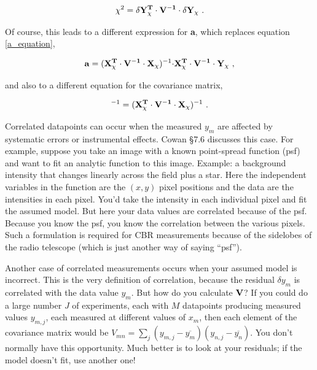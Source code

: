 \documentclass[psfig,preprint]{aastex}
\begin{document}
\begin{mathletters}
\begin{equation}
\label{chisq_cov}
\chi^2 =  {\bf \delta Y_\chi^T \cdot V^{-1} \cdot \delta Y_\chi} \ .
\end{equation}

\noindent Of course, this leads to a different expression for {\bf a},
which replaces equation \ref{a_equation},

\begin{equation}
{\bf a} = ({\bf X_\chi^T \cdot V^{-1} \cdot X_\chi})^{-1} 
	{\bf \cdot X_\chi^T \cdot V^{-1} \cdot Y_\chi}  \ ,
\end{equation}

\noindent and also to a different equation for the covariance matrix,

\begin{equation}
[\alpha_\chi]^{-1} = ({\bf X_\chi^T \cdot V^{-1} \cdot X_\chi})^{-1} \ .
\end{equation}
\end{mathletters}

	Correlated datapoints can occur when the measured $y_m$ are
affected by systematic errors or instrumental effects.  Cowan \S 7.6
discusses this case.  For example, suppose you take an image with a
known point-spread function (psf) and want to fit an analytic function
to this image.  Example: a background intensity that changes linearly
across the field plus a star.  Here the independent variables in the
function are the $(x,y)$ pixel positions and the data are the
intensities in each pixel.  You'd take the intensity in each individual
pixel and fit the assumed model.  But here your data values are
correlated because of the psf.  Because you know the psf, you know the
correlation between the various pixels.  Such a formulation is required
for CBR measurements because of the sidelobes of the radio telescope
(which is just another way of saying ``psf'').

	Another case of correlated measurements occurs when your assumed
model is incorrect.  This is the very definition of correlation, because
the residual $\delta y_m$ is correlated with the data value $y_m$.  But
how do you calculate ${\bf V}$? If you could do a large number $J$ of
experiments, each with $M$ datapoints producing measured values
$y_{m,j}$, each measured at different values of $x_{m}$, then each
element of the covariance matrix would be $V_{mn} = \sum_j (y_{m,j} -
\overline{y_m}) (y_{n,j} - \overline{y_n})$.  You don't normally have
this opportunity.  Much better is to look at your residuals; if the
model doesn't fit, use another one!
\end{document}
